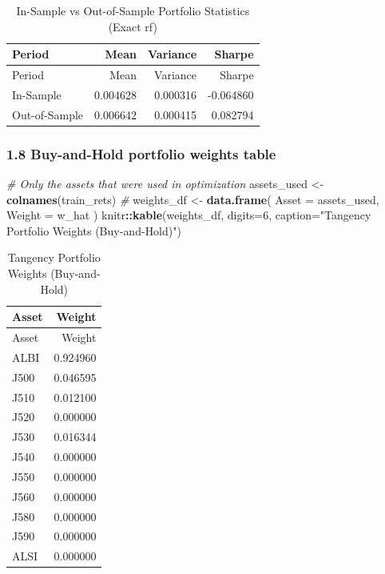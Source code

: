 \documentclass[
  12pt,
]{article}
\newenvironment{Shaded}{\begin{snugshade}}{\end{snugshade}}
\newcommand{\AttributeTok}[1]{\textcolor[rgb]{0.13,0.29,0.53}{#1}}
\newcommand{\CommentTok}[1]{\textcolor[rgb]{0.56,0.35,0.01}{\textit{#1}}}
\newcommand{\DecValTok}[1]{\textcolor[rgb]{0.00,0.00,0.81}{#1}}
\newcommand{\FunctionTok}[1]{\textcolor[rgb]{0.13,0.29,0.53}{\textbf{#1}}}
\newcommand{\NormalTok}[1]{#1}
\newcommand{\OtherTok}[1]{\textcolor[rgb]{0.56,0.35,0.01}{#1}}
\newcommand{\SpecialCharTok}[1]{\textcolor[rgb]{0.81,0.36,0.00}{\textbf{#1}}}
\newcommand{\StringTok}[1]{\textcolor[rgb]{0.31,0.60,0.02}{#1}}
\begin{document}
\begin{longtable}[]{@{}lrrr@{}}
\caption{In-Sample vs Out-of-Sample Portfolio Statistics (Exact
rf)}\tabularnewline
\toprule\noalign{}
Period & Mean & Variance & Sharpe \\
\midrule\noalign{}
\endfirsthead
\toprule\noalign{}
Period & Mean & Variance & Sharpe \\
\midrule\noalign{}
\endhead
\bottomrule\noalign{}
\endlastfoot
In-Sample & 0.004628 & 0.000316 & -0.064860 \\
Out-of-Sample & 0.006642 & 0.000415 & 0.082794 \\
\end{longtable}

\subsubsection{1.8 Buy-and-Hold portfolio weights
table}\label{buy-and-hold-portfolio-weights-table}

\begin{Shaded}
\begin{Highlighting}[]
\CommentTok{\# Only the assets that were used in optimization}
\NormalTok{assets\_used }\OtherTok{\textless{}{-}} \FunctionTok{colnames}\NormalTok{(train\_rets)  }\CommentTok{\#}
\NormalTok{weights\_df }\OtherTok{\textless{}{-}} \FunctionTok{data.frame}\NormalTok{(}
  \AttributeTok{Asset  =}\NormalTok{ assets\_used,}
  \AttributeTok{Weight =}\NormalTok{ w\_hat}
\NormalTok{)}
\NormalTok{knitr}\SpecialCharTok{::}\FunctionTok{kable}\NormalTok{(weights\_df, }\AttributeTok{digits=}\DecValTok{6}\NormalTok{, }\AttributeTok{caption=}\StringTok{"Tangency Portfolio Weights (Buy{-}and{-}Hold)"}\NormalTok{)}
\end{Highlighting}
\end{Shaded}

\begin{longtable}[]{@{}lr@{}}
\caption{Tangency Portfolio Weights (Buy-and-Hold)}\tabularnewline
\toprule\noalign{}
Asset & Weight \\
\midrule\noalign{}
\endfirsthead
\toprule\noalign{}
Asset & Weight \\
\midrule\noalign{}
\endhead
\bottomrule\noalign{}
\endlastfoot
ALBI & 0.924960 \\
J500 & 0.046595 \\
J510 & 0.012100 \\
J520 & 0.000000 \\
J530 & 0.016344 \\
J540 & 0.000000 \\
J550 & 0.000000 \\
J560 & 0.000000 \\
J580 & 0.000000 \\
J590 & 0.000000 \\
ALSI & 0.000000 \\
\end{longtable}
\end{document}
